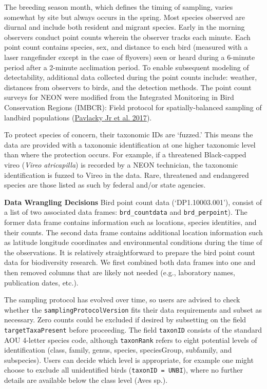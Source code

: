 \documentclass[
  12pt,
]{article}
\begin{document}
The breeding season month, which defines the timing of sampling, varies somewhat by site but always occurs in the spring. Most species observed are diurnal and include both resident and migrant species. Early in the morning observers conduct point counts wherein the observer tracks each minute. Each point count contains species, sex, and distance to each bird (measured with a laser rangefinder except in the case of flyovers) seen or heard during a 6-minute period after a 2-minute acclimation period. To enable subsequent modeling of detectability, additional data collected during the point counts include: weather, distances from observers to birds, and the detection methods. The point count surveys for NEON were modified from the Integrated Monitoring in Bird Conservation Regions (IMBCR): Field protocol for spatially-balanced sampling of landbird populations (\protect\hyperlink{ref-pavlacky2017statistically}{Pavlacky Jr et al. 2017}).

To protect species of concern, their taxonomic IDs are `fuzzed.' This means the data are provided with a taxonomic identification at one higher taxonomic level than where the protection occurs. For example, if a threatened Black-capped vireo (\emph{Vireo atricapilla}) is recorded by a NEON technician, the taxonomic identification is fuzzed to Vireo in the data. Rare, threatened and endangered species are those listed as such by federal and/or state agencies.

\textbf{Data Wrangling Decisions} Bird point count data (`DP1.10003.001'), consist of a list of two associated data frames: \texttt{brd\_countdata} and \texttt{brd\_perpoint}). The former data frame contains information such as locations, species identities, and their counts. The second data frame contains additional location information such as latitude longitude coordinates and environmental conditions during the time of the observations. It is relatively straightforward to prepare the bird point count data for biodiversity research. We first combined both data frames into one and then removed columns that are likely not needed (e.g., laboratory names, publication dates, etc.).

The sampling protocol has evolved over time, so users are advised to check whether the \texttt{samplingProtocolVersion} fits their data requirements and subset as necessary. Zero counts could be excluded if desired by subsetting on the field \texttt{targetTaxaPresent} before proceeding. The field \texttt{taxonID} consists of the standard AOU 4-letter species code, although \texttt{taxonRank} refers to eight potential levels of identification (class, family, genus, species, speciesGroup, subfamily, and subspecies). Users can decide which level is appropriate, for example one might choose to exclude all unidentified birds (\texttt{taxonID\ =\ UNBI}), where no further details are available below the class level (Aves sp.).
\end{document}
